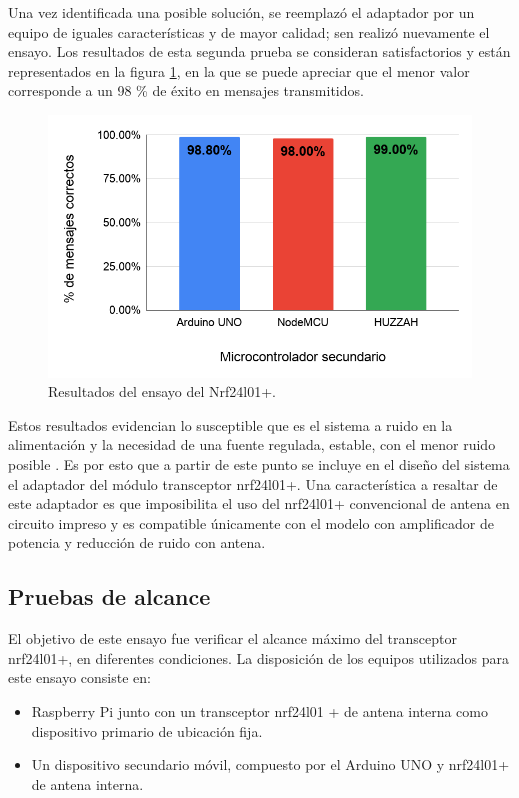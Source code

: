Una vez identificada una posible solución, se reemplazó el adaptador por un equipo de iguales características y de mayor calidad; sen realizó nuevamente el ensayo. Los resultados de esta segunda prueba se consideran satisfactorios y están representados en la figura \ref{fig:figura_b}, en la que se puede apreciar que el menor valor corresponde a un 98 \% de éxito en mensajes transmitidos.


\begin{figure}[ht]
	\centering
	\includegraphics[scale=.45]{./Figures/Capitulo4/Figura_B.png}
	\caption{Resultados del ensayo del Nrf24l01+.}
	\label{fig:figura_b}
\end{figure}

Estos resultados evidencian lo susceptible que es el sistema a ruido en la alimentación y la necesidad de una fuente regulada, estable, con el menor ruido posible \cite{nrf24guide}. Es por esto que a partir de este punto se incluye en el diseño del sistema el adaptador del módulo transceptor nrf24l01+. Una característica a resaltar de este adaptador es que imposibilita el uso del nrf24l01+ convencional de antena en circuito impreso y es compatible únicamente con el modelo con amplificador de potencia y reducción de ruido con antena.


\subsection{Pruebas de alcance}
 

El objetivo de este ensayo fue verificar el alcance máximo del transceptor nrf24l01+, en diferentes condiciones. La disposición de los equipos utilizados para este ensayo consiste en:

\begin{itemize}
\item Raspberry Pi junto con un transceptor nrf24l01 + de antena interna como dispositivo primario de ubicación fija.
\item Un dispositivo secundario móvil, compuesto por el Arduino UNO y nrf24l01+ de antena interna.
\end{itemize}

